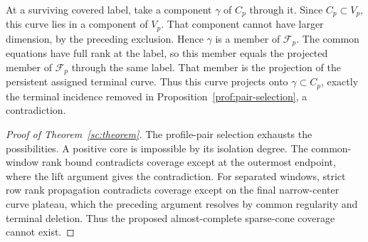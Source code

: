 At a surviving covered label, take a component $\gamma$
of $C_p$ through it.  Since $C_p\subset V_p$, this curve
lies in a component of $V_p$.  That component cannot have
larger dimension, by the preceding exclusion.  Hence
$\gamma$ is a member of $\mathcal F_p$.  The common
equations have full rank at the label, so this member
equals the projected member of $\mathcal F_p$ through the same label.
That member is the projection of the persistent assigned terminal curve.
Thus this curve projects onto $\gamma\subset C_p$, exactly the terminal incidence
removed in Proposition~\ref{prof:pair-selection}, a
contradiction.

\begin{proof}[Proof of Theorem~\ref{sc:theorem}]
The profile-pair selection exhausts the possibilities.
A positive core is impossible by its isolation degree.
The common-window rank bound contradicts coverage except
at the outermost endpoint, where the lift argument gives
the contradiction.  For separated windows, strict row
rank propagation contradicts coverage except on the
final narrow-center curve plateau, which the preceding
argument resolves by common regularity and terminal
deletion.  Thus the proposed almost-complete sparse-cone
coverage cannot exist.
\end{proof}
